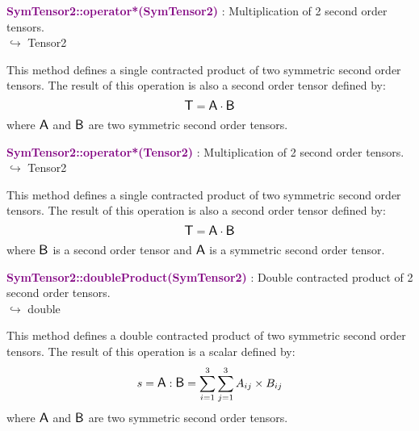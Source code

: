 \textcolor{purple}{\textbf{SymTensor2::operator*(SymTensor2)}}\label{SymTensor2::operator*(SymTensor2)} : Multiplication of 2 second order tensors.\\ \hspace*{5mm}$\hookrightarrow$ Tensor2

This method defines a single contracted product of two symmetric second order tensors.
The result of this operation is also a second order tensor defined by:
\begin{equation*}
\mbox{\large\ensuremath{\mathsf{T}}} = \mbox{\large\ensuremath{\mathsf{A}}} \cdot \mbox{\large\ensuremath{\mathsf{B}}}
\end{equation*}
where $\mbox{\large\ensuremath{\mathsf{A}}}$ and $\mbox{\large\ensuremath{\mathsf{B}}}$ are two symmetric second order tensors.

\textcolor{purple}{\textbf{SymTensor2::operator*(Tensor2)}}\label{SymTensor2::operator*(Tensor2)} : Multiplication of 2 second order tensors.\\ \hspace*{5mm}$\hookrightarrow$ Tensor2

This method defines a single contracted product of two symmetric second order tensors.
The result of this operation is also a second order tensor defined by:
\begin{equation*}
\mbox{\large\ensuremath{\mathsf{T}}} = \mbox{\large\ensuremath{\mathsf{A}}} \cdot \mbox{\large\ensuremath{\mathsf{B}}}
\end{equation*}
where $\mbox{\large\ensuremath{\mathsf{B}}}$ is a second order tensor and $\mbox{\large\ensuremath{\mathsf{A}}}$ is a symmetric second order tensor.

\textcolor{purple}{\textbf{SymTensor2::doubleProduct(SymTensor2)}}\label{SymTensor2::doubleProduct(SymTensor2)} : Double contracted product of 2 second order tensors.\\ \hspace*{5mm}$\hookrightarrow$ double

This method defines a double contracted product of two symmetric second order tensors.
The result of this operation is a scalar defined by:
\begin{equation*}
s = \mbox{\large\ensuremath{\mathsf{A}}} : \mbox{\large\ensuremath{\mathsf{B}}} = \sum_{i=1}^{3} \sum_{j=1}^{3} A_{ij}\times B_{ij}
\end{equation*}
where $\mbox{\large\ensuremath{\mathsf{A}}}$ and $\mbox{\large\ensuremath{\mathsf{B}}}$ are two symmetric second order tensors.

